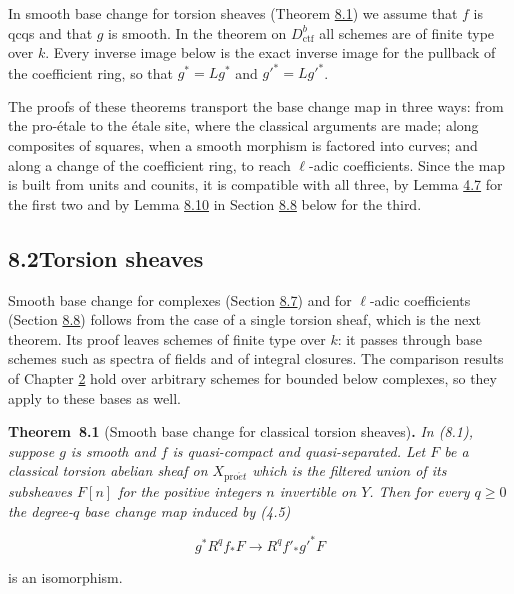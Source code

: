 \documentclass[11pt]{article}
\newenvironment{bpstatement}[2]{\par\addvspace{0.6\baselineskip}\noindent\textbf{#1}#2\textbf{.}\enspace\ignorespaces}
  {\par\addvspace{0.4\baselineskip}}
\newenvironment{bpstatementit}[2]{\begin{bpstatement}{#1}{#2}\itshape\ignorespaces}{\end{bpstatement}}
\begin{document}
In smooth base change for torsion sheaves (Theorem \hyperref[bp643]{8.1}) we assume that \(f\) is qcqs and that \(g\) is smooth. In the theorem on \(D^b_{\mathrm{ctf}}\) all schemes are of finite type over \(k\). Every inverse image below is the exact inverse image for the pullback of the coefficient ring, so that \(g^*=Lg^*\) and \(g'^*=Lg'^*\).

The proofs of these theorems transport the base change map in three ways: from the pro-étale to the étale site, where the classical arguments are made; along composites of squares, when a smooth morphism is factored into curves; and along a change of the coefficient ring, to reach \(\ell\)-adic coefficients. Since the map is built from units and counits, it is compatible with all three, by Lemma \hyperref[bp304]{4.7} for the first two and by Lemma \hyperref[bp679]{8.10} in Section \hyperref[bp677]{8.8} below for the third.


\subsection*{\texorpdfstring{8.2\quad Torsion sheaves}{8.2 Torsion sheaves}}
\label{bp641}%
\label{bp642}%
Smooth base change for complexes (Section \hyperref[bp672]{8.7}) and for \(\ell\)-adic coefficients (Section \hyperref[bp677]{8.8}) follows from the case of a single torsion sheaf, which is the next theorem. Its proof leaves schemes of finite type over \(k\): it passes through base schemes such as spectra of fields and of integral closures. The comparison results of Chapter \hyperref[bp3]{2} hold over arbitrary schemes for bounded below complexes, so they apply to these bases as well.

\label{bp643}%
\begin{bpstatementit}{Theorem~8.1}{ (Smooth base change for classical torsion sheaves)}
In (8.1), suppose \(g\) is smooth and \(f\) is quasi-compact and quasi-separated. Let \(F\) be a classical torsion abelian sheaf on \(X_{\mathrm{pro}\acute{e}t}\) which is the filtered union of its subsheaves \(F[n]\) for the positive integers \(n\) invertible on \(Y\). Then for every \(q\geq0\) the degree-\(q\) base change map induced by (4.5)

\[
g^*R^qf_*F\longrightarrow R^qf'_*g'^*F
\]

is an isomorphism.
\end{bpstatementit}
\end{document}
